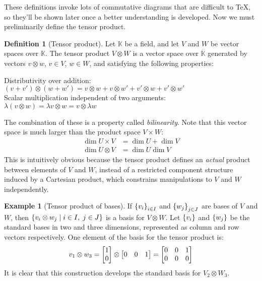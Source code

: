 \documentclass[svgnames]{article}
\theoremstyle{definition}
\newtheorem{Definition}{Definition}
\newtheorem*{Example*}{Example}
\theoremstyle{remark}
\theoremstyle{underline}
\theoremstyle{underline}
\begin{document}
	These definitions invoke lots of commutative diagrams that are difficult to \TeX, so they'll be shown later once a better understanding is developed. Now we must preliminarily define the tensor product.
	
	\begin{Definition}[Tensor product]\label{def:TensorProd}
		Let $\mathbb{K}$ be a field, and let $V$ and $W$ be vector spaces over $\mathbb{K}$. The tensor product $ V\otimes W $ is a vector space over $ \mathbb{K} $ generated by vectors $v \otimes w$, $v \in V$, $w \in W$, and satisfying the following properties:
		\begin{center}
			Distributivity over addition: \hfill $ (v + v') \otimes (w + w') = v \otimes w + v \otimes w' + v' \otimes w + v' \otimes w'$\\
			Scalar multiplication independent of two arguments: \hfill $ \lambda(v \otimes w) = \lambda v \otimes w = v \otimes \lambda w$
		\end{center}
	\end{Definition}
	
	The combination of these is a property called \emph{bilinearity}. Note that this vector space is much larger than the product space $V \times W$:
	\begin{align*}
		\dim U \times V & = \dim U + \dim V\\
		\dim U \otimes V & = \dim U \dim V
	\end{align*}
	This is intuitively obvious because the tensor product defines an \emph{actual} product between elements of $V$ and $W$, instead of a restricted component structure induced by a Cartesian product, which constrains manipulations to $V$ and $W$ independently.
	
	\begin{Example*}[Tensor product of bases]
		If $ \qty{v_i}_{i \in I}$ and $ \qty{w_j}_{j \in J} $ are bases of $V$ and $W$, then $ \qty{v_i \otimes w_j \mid i \in I, \; j \in J}$ is a basis for $V \otimes W$. Let $ \qty{v_i}$ and $\qty{w_j} $ be the standard bases in two and three dimensions, represented as column and row vectors respectively. One element of the basis for the tensor product is:
		\begin{gather*}
		v_1 \otimes w_3 = \mqty[1 \\ 0] \otimes \mqty[0 & 0 & 1]  = \mqty[0 & 0 & 1 \\ 0 & 0 & 0]
		\end{gather*}
		It is clear that this construction develops the standard basis for $V_{2} \otimes W_{3}$.
	\end{Example*}
	
\end{document}
